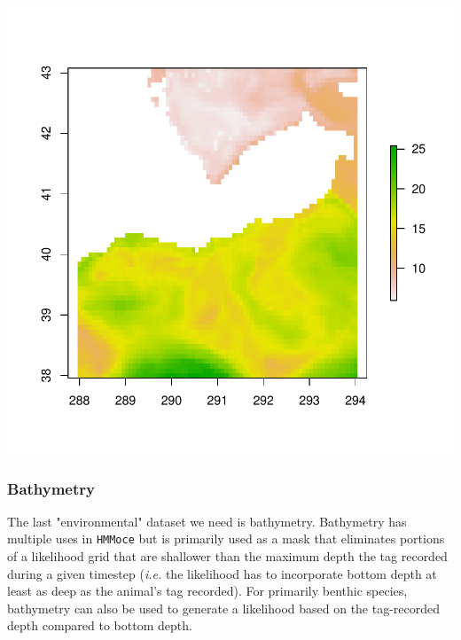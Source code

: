 \documentclass{article}\usepackage[]{graphicx}\usepackage[]{color}
\makeatletter
\def\maxwidth{ %
  \ifdim\Gin@nat@width>\linewidth
    \linewidth
  \else
    \Gin@nat@width
  \fi
}
\newenvironment{knitrout}{}{} %
\newcommand{\ie}{\textit{i.e.} }
\makeatother
\begin{document}
\begin{knitrout}
\includegraphics[width=\maxwidth]{figure/env-hycom-3} 

\end{knitrout}

\subsubsection{Bathymetry}

The last "environmental" dataset we need is bathymetry. Bathymetry has multiple uses in \texttt{HMMoce} but is primarily used as a mask that eliminates portions of a likelihood grid that are shallower than the maximum depth the tag recorded during a given timestep (\ie the likelihood has to incorporate bottom depth at least as deep as the animal's tag recorded). For primarily benthic species, bathymetry can also be used to generate a likelihood based on the tag-recorded depth compared to bottom depth.
\end{document}
